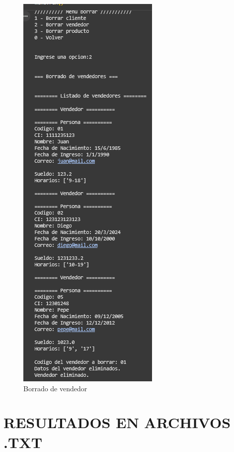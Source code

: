 \documentclass[11pt]{article}
\begin{document}
\begin{multicols}{2}
\begin{figure}[H]
    \centering
    \includegraphics[width=0.5\linewidth]{./anexos/evidencias/eliminarVendedor.png}
    \caption{Borrado de vendedor}
    \label{fig:eliminarVendedor}
\end{figure}

\end{multicols}

\newpage

\section{RESULTADOS EN ARCHIVOS .TXT}





\end{document}
